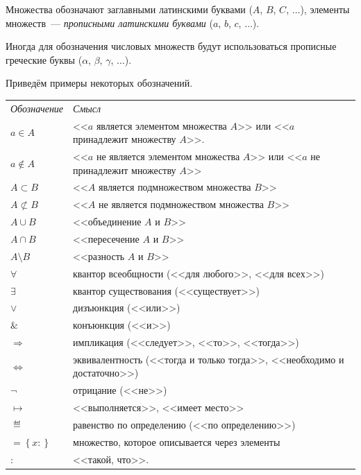 \setcounter{section}{-1}

Множества обозначают заглавными латинскими буквами (\(A\), \(B\), \(C\), \(\dots\)), элементы
множеств~--- \textit{прописными латинскими буквами} (\(a\), \(b\), \(c\), \(\dots\)).

Иногда для обозначения числовых множеств будут использоваться прописные греческие буквы (\(\alpha\),
\(\beta\), \(\gamma\), \(\dots\)).

Приведём примеры некоторых обозначений.

\vspace{-8pt}
\begin{table}[H]
\begin{tabular}{ll}
\textit{Обозначение} & \textit{Смысл}\\
\(a \in A\) & <<\(a\) является элементом множества \(A\)>> или <<\(a\) принадлежит множеству
    \(A\)>>.\\
\(a \notin A\) & <<\(a\) не является элементом множества \(A\)>> или <<\(a\) не принадлежит
    множеству \(A\)>>\\
\(A \subset B\) & <<\(A\) является подмножеством множества \(B\)>>\\
\(A \not\subset B\) & <<\(A\) не является подмножеством множества \(B\)>>\\
\(A \cup B\) & <<объединение \(A\) и \(B\)>>\\
\(A \cap B\) & <<пересечение \(A\) и \(B\)>>\\
\(A \setminus B\) & <<разность \(A\) и \(B\)>>\\
\(\forall\) & квантор всеобщности (<<для любого>>, <<для всех>>)\\
\(\exists\) & квантор существования (<<существует>>)\\
\(\lor\) & дизъюнкция (<<или>>)\\
\(\&\) & конъюнкция (<<и>>)\\
\(\Rightarrow\) & импликация (<<следует>>, <<то>>, <<тогда>>)\\
\(\Leftrightarrow\) & эквивалентность (<<тогда и только тогда>>, <<необходимо и достаточно>>)\\
\(\neg\) & отрицание (<<не>>)\\
\(\mapsto\) & <<выполняется>>, <<имеет место>>\\
\(\eqdef\) & равенство по определению (<<по определению>>)\\
\(=\left\{x:\right\}\) & множество, которое описывается через элементы\\
\(:\) & <<такой, что>>.
\end{tabular}
\end{table}
\vspace{-14pt}

